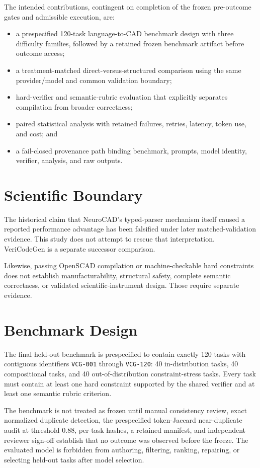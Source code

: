 \documentclass[conference]{IEEEtran}
\begin{document}
The intended contributions, contingent on completion of the frozen pre-outcome gates and admissible execution, are:
\begin{itemize}
    \item a prespecified 120-task language-to-CAD benchmark design with three difficulty families, followed by a retained frozen benchmark artifact before outcome access;
    \item a treatment-matched direct-versus-structured comparison using the same provider/model and common validation boundary;
    \item hard-verifier and semantic-rubric evaluation that explicitly separates compilation from broader correctness;
    \item paired statistical analysis with retained failures, retries, latency, token use, and cost; and
    \item a fail-closed provenance path binding benchmark, prompts, model identity, verifier, analysis, and raw outputs.
\end{itemize}

\section{Scientific Boundary}
The historical claim that NeuroCAD's typed-parser mechanism itself caused a reported performance advantage has been falsified under later matched-validation evidence. This study does not attempt to rescue that interpretation. VeriCodeGen is a separate successor comparison.

Likewise, passing OpenSCAD compilation or machine-checkable hard constraints does not establish manufacturability, structural safety, complete semantic correctness, or validated scientific-instrument design. Those require separate evidence.

\section{Benchmark Design}
The final held-out benchmark is prespecified to contain exactly 120 tasks with contiguous identifiers \texttt{VCG-001} through \texttt{VCG-120}: 40 in-distribution tasks, 40 compositional tasks, and 40 out-of-distribution constraint-stress tasks. Every task must contain at least one hard constraint supported by the shared verifier and at least one semantic rubric criterion.

The benchmark is not treated as frozen until manual consistency review, exact normalized duplicate detection, the prespecified token-Jaccard near-duplicate audit at threshold 0.88, per-task hashes, a retained manifest, and independent reviewer sign-off establish that no outcome was observed before the freeze. The evaluated model is forbidden from authoring, filtering, ranking, repairing, or selecting held-out tasks after model selection.
\end{document}
